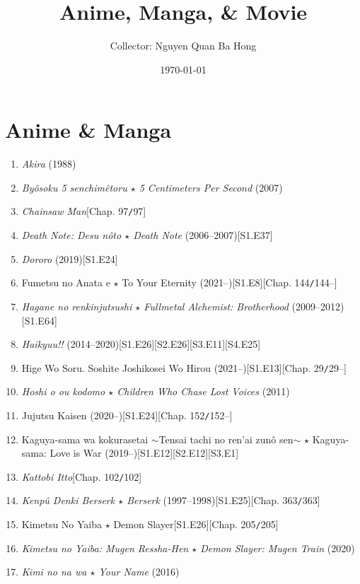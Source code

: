 \documentclass{article}
\title{Anime, Manga, {\large\&} Movie}
\author{Collector: Nguyen Quan Ba Hong}
\date{\today}
\numberwithin{equation}{section}
\begin{document}
\maketitle
\tableofcontents


\section{Anime \& Manga}
\begin{enumerate}
    \item \textit{Akira} (1988)
    \item \textit{Byôsoku 5 senchimêtoru $\star$ 5 Centimeters Per Second} (2007)
    \item \textit{Chainsaw Man}\hfill[Chap. 97\texttt{/}97]
    \item \textit{Death Note: Desu nôto $\star$ Death Note} (2006--2007)\hfill[S1.E37]
    \item \textit{Dororo} (2019)\hfill[S1.E24]
    \item Fumetsu no Anata e $\star$ To Your Eternity (2021--)\hfill[S1.E8][Chap. 144\texttt{/}144--]
    \item \textit{Hagane no renkinjutsushi $\star$ Fullmetal Alchemist: Brotherhood} (2009--2012)\hfill[S1.E64]
    \item \textit{Haikyuu!!} (2014--2020)\hfill[S1.E26][S2.E26][S3.E11][S4.E25]
    \item Hige Wo Soru. Soshite Joshikosei Wo Hirou (2021--)\hfill[S1.E13][Chap. 29\texttt{/}29--]
    \item \textit{Hoshi o ou kodomo $\star$ Children Who Chase Lost Voices} (2011)
    \item Jujutsu Kaisen (2020--)\hfill[S1.E24][Chap. 152\texttt{/}152--]
    \item Kaguya-sama wa kokurasetai $\sim$Tensai tachi no ren'ai zun\^o sen$\sim$ $\star$ Kaguya-sama: Love is War (2019--)\hfill[S1.E12][S2.E12][S3.E1]
    \item \textit{Kattobi Itto}\hfill[Chap. 102\texttt{/}102]
    \item \textit{Kenp\^u Denki Berserk $\star$ Berserk} (1997--1998)\hfill[S1.E25][Chap. 363\texttt{/}363]
    \item Kimetsu No Yaiba $\star$ Demon Slayer\hfill[S1.E26][Chap. 205\texttt{/}205]
    \item \textit{Kimetsu no Yaiba: Mugen Ressha-Hen $\star$ Demon Slayer: Mugen Train} (2020)
    \item \textit{Kimi no na wa $\star$ Your Name} (2016)

\end{enumerate}
\end{document}
